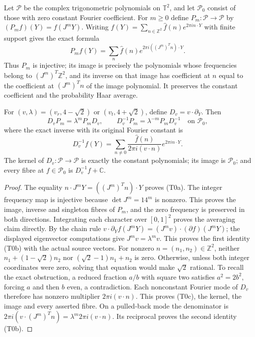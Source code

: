 \begin{theorem}
\label{thm:ns-directional-intertwining}
Let $\mathcal P$ be the complex trigonometric polynomials on
$\mathbb T^2$, and let $\mathcal P_0$ consist of those with zero
constant Fourier coefficient. For $m\geq0$ define
$P_m:\mathcal P\to\mathcal P$ by $(P_m f)(Y)=f(J^mY)$.
Writing $f(Y)=\sum_{n\in\mathbb Z^2}\widehat f(n)
e^{2\pi i n\cdot Y}$ with finite support gives the exact formula
\[
 P_m f(Y)=\sum_n\widehat f(n)e^{2\pi i((J^m)^Tn)\cdot Y}.
                                                               \tag{T0a}
\]
Thus $P_m$ is injective; its image is precisely the polynomials
whose frequencies belong to $(J^m)^T\mathbb Z^2$, and its inverse
on that image has coefficient at $n$ equal to the coefficient at
$(J^m)^Tn$ of the image polynomial. It preserves the constant
coefficient and the probability Haar average.

For $(v,\lambda)=(v_r,4-\sqrt2)$ or $(v_t,4+\sqrt2)$, define
$D_v=v\cdot\partial_Y$. Then
\[
 D_vP_m=\lambda^mP_mD_v,\qquad
 D_v^{-1}P_m=\lambda^{-m}P_mD_v^{-1}\quad\text{on }\mathcal P_0,
                                                               \tag{T0b}
\]
where the exact inverse with its original Fourier constant is
\[
 D_v^{-1}f(Y)=\sum_{n\ne0}
       \frac{\widehat f(n)}{2\pi i(v\cdot n)}e^{2\pi i n\cdot Y}.
                                                               \tag{T0c}
\]
The kernel of $D_v:\mathcal P\to\mathcal P$ is exactly the
constant polynomials; its image is $\mathcal P_0$; and every
fibre at $f\in\mathcal P_0$ is $D_v^{-1}f+\mathbb C$.
\end{theorem}
\begin{proof}
The equality $n\cdot J^mY=((J^m)^Tn)\cdot Y$ proves (T0a).
The integer frequency map is injective because $\det J^m=14^m$
is nonzero. This proves the image, inverse and singleton fibres
of $P_m$, and the zero frequency is preserved in both directions.
Integrating each character over $[0,1]^2$ proves the averaging
claim directly. By the chain rule
$v\cdot\partial_Y f(J^mY)=(J^mv)\cdot(\partial f)(J^mY)$;
the displayed eigenvector computations give $J^mv=\lambda^mv$.
This proves the first identity (T0b) with the actual source vectors.
For nonzero $n=(n_1,n_2)\in\mathbb Z^2$, neither
$n_1+(1-\sqrt2)n_2$ nor $(\sqrt2-1)n_1+n_2$ is zero.
Otherwise, unless both integer coordinates were zero, solving
that equation would make $\sqrt2$ rational. To recall the exact
obstruction, a reduced fraction $a/b$ with square two satisfies
$a^2=2b^2$, forcing $a$ and then $b$ even, a contradiction.
Each nonconstant Fourier mode of $D_v$ therefore has nonzero
multiplier $2\pi i(v\cdot n)$. This proves (T0c), the kernel,
the image and every asserted fibre. On a pulled-back mode the
denominator is
$2\pi i(v\cdot(J^m)^Tn)=\lambda^m2\pi i(v\cdot n)$.
Its reciprocal proves the second identity (T0b).
\end{proof}

